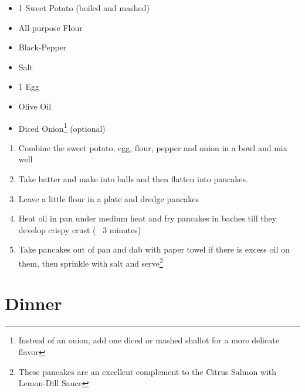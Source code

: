\documentclass[oneside]{recipe}
\newcommand{\recipecolumn}[2]{
	\begin{multicols}{2}
	\raggedcolumns
	#1
	\columnbreak
	#2
	\end{multicols}
}
\begin{document}
\recipecolumn{
	\begin{itemize}
		\item 1 Sweet Potato (boiled and mashed)
		\item All-purpose Flour
		\item Black-Pepper
		\item Salt
		\item 1 Egg
		\item Olive Oil
		\item Diced Onion\footnote{Instead of an onion, add one diced or mashed shallot for a more delicate flavor} (optional)
	\end{itemize}
}{
	\begin{enumerate}
		\item Combine the sweet potato, egg, flour, pepper and onion in a bowl and mix well
		\item Take batter and make into balls and then flatten into pancakes.
		\item Leave a little flour in a plate and dredge pancakes
		\item Heat oil in pan under medium heat and fry pancakes in baches till they develop crispy crust (~ 3 minutes)
		\item Take pancakes out of pan and dab with paper towel if there is excess oil on them, then sprinkle with salt and serve\footnote{These pancakes are an excellent complement to the Citrus Salmon with Lemon-Dill Sauce}
	\end{enumerate}
}

\chapter{Dinner}
 
\end{document}
